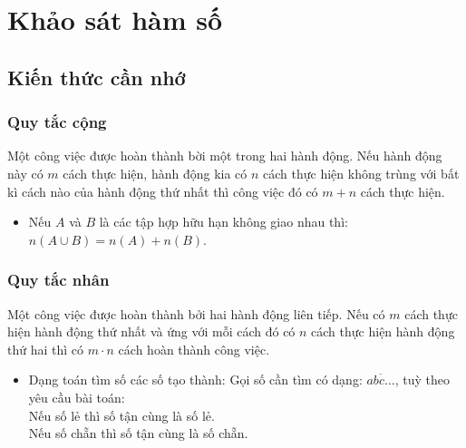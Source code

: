 \section{Khảo sát hàm số}
\subsection{Kiến thức cần nhớ}
\begin{khung}
	\subsubsection{Quy tắc cộng} Một công việc được hoàn thành bời một trong hai hành động. Nếu hành động này có $m$ cách thực hiện, hành động kia có $n$ cách thực hiện không trùng với bất kì cách nào của hành động thứ nhất thì công việc đó có $m + n$ cách thực hiện.
	\begin{itemize}
		\item Nếu $A$ và $B$ là các tập hợp hữu hạn không giao nhau thì: $n(A\cup B)=n(A)+n(B)$.
	\end{itemize}
	\subsubsection{Quy tắc nhân} Một công việc được hoàn thành bởi hai hành động liên tiếp. Nếu có $m$ cách thực hiện hành động thứ nhất và ứng với mỗi cách đó có $n$ cách thực hiện hành động thứ hai thì có $m\cdot n$ cách hoàn thành công việc.
	\begin{itemize}
		\item Dạng toán tìm số các số tạo thành: Gọi số cần tìm có dạng: $\overline{abc\ldots}$, tuỳ theo yêu cầu bài toán:\\
		Nếu số lẻ thì số tận cùng là số lẻ.\\
		Nếu số chẵn thì số tận cùng là số chẵn.
	\end{itemize}
\end{khung}
